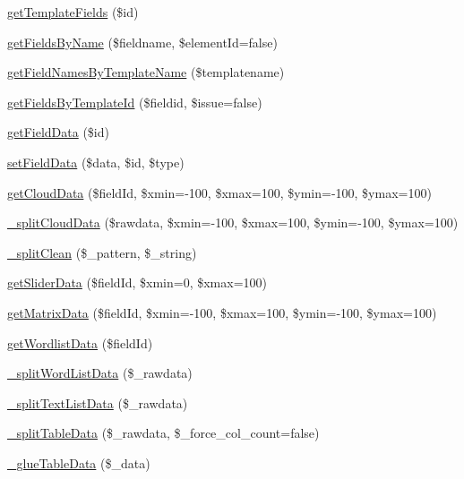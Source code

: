 \begin{DoxyCompactItemize}
\item 
\hyperlink{classrokfor___d_b_a4e4817fb5f02855babe16f7e0611b310}{get\-Template\-Fields} (\$id)
\item 
\hyperlink{classrokfor___d_b_ab63eab8e087779aeddf6999d2efe7dec}{get\-Fields\-By\-Name} (\$fieldname, \$element\-Id=false)
\item 
\hyperlink{classrokfor___d_b_a16e5ecd1298d430bf50b54f9838c785a}{get\-Field\-Names\-By\-Template\-Name} (\$templatename)
\item 
\hyperlink{classrokfor___d_b_ab517c7ce5a1c68c903edbb0bf8656d0f}{get\-Fields\-By\-Template\-Id} (\$fieldid, \$issue=false)
\item 
\hyperlink{classrokfor___d_b_a48b67b40557bfa9ba8737fc763770ea0}{get\-Field\-Data} (\$id)
\item 
\hyperlink{classrokfor___d_b_a4e54441b478ff151d2251dca986d2b23}{set\-Field\-Data} (\$data, \$id, \$type)
\item 
\hyperlink{classrokfor___d_b_acdc1b96abed965253edbf679683c2c4a}{get\-Cloud\-Data} (\$field\-Id, \$xmin=-\/100, \$xmax=100, \$ymin=-\/100, \$ymax=100)
\item 
\hyperlink{classrokfor___d_b_acf1c352cec538014d301207aa72222c1}{\-\_\-split\-Cloud\-Data} (\$rawdata, \$xmin=-\/100, \$xmax=100, \$ymin=-\/100, \$ymax=100)
\item 
\hyperlink{classrokfor___d_b_a0ebaf78e4aa380bac5648485d711d874}{\-\_\-split\-Clean} (\$\-\_\-pattern, \$\-\_\-string)
\item 
\hyperlink{classrokfor___d_b_ad7d8994bb1b830838968ff00c0da59d8}{get\-Slider\-Data} (\$field\-Id, \$xmin=0, \$xmax=100)
\item 
\hyperlink{classrokfor___d_b_aea302de7ee07faaed9b0d7ee6be7d9e1}{get\-Matrix\-Data} (\$field\-Id, \$xmin=-\/100, \$xmax=100, \$ymin=-\/100, \$ymax=100)
\item 
\hyperlink{classrokfor___d_b_ab9a243f64faeb5cd2a7fce8deaf756f2}{get\-Wordlist\-Data} (\$field\-Id)
\item 
\hyperlink{classrokfor___d_b_a9b9b200bee98ec42949b81644b7c760e}{\-\_\-split\-Word\-List\-Data} (\$\-\_\-rawdata)
\item 
\hyperlink{classrokfor___d_b_a667716009c6acc088e29d0d6a97b1db6}{\-\_\-split\-Text\-List\-Data} (\$\-\_\-rawdata)
\item 
\hyperlink{classrokfor___d_b_ab4976c3e948ee5de581b9893c774aa25}{\-\_\-split\-Table\-Data} (\$\-\_\-rawdata, \$\-\_\-force\-\_\-col\-\_\-count=false)
\item 
\hyperlink{classrokfor___d_b_ae021306373e3c9c0bffe17691e80190e}{\-\_\-glue\-Table\-Data} (\$\-\_\-data)

\end{DoxyCompactItemize}
